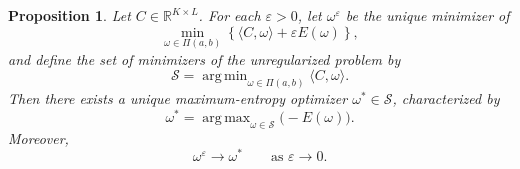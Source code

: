 \documentclass[a4paper,11pt]{article}
\numberwithin{equation}{section}
\newtheorem{prop}[thm]{Proposition}
\DeclareMathOperator*{\argmin}{arg\,min}
\DeclareMathOperator*{\argmax}{arg\,max}
\newcommand{\eps}{\varepsilon}
\newcommand{\RR}{\mathbb{R}}
\begin{document}
\begin{prop}\label{prop:entropy-selection}
Let $C\in\RR^{K\times L}$. For each $\eps>0$, let $\omega^\eps$ be the unique minimizer of
\begin{equation}\label{eq:entropy-regularized-linear-problem}
  \min_{\omega\in\Pi(a,b)}
  \left\{
  \langle C,\omega\rangle+\eps E(\omega)
  \right\},
\end{equation}
and define the set of minimizers of the unregularized problem by
\begin{equation}\label{eq:unregularized-optimal-set}
  \mathcal S=\argmin_{\omega\in\Pi(a,b)}\langle C,\omega\rangle.
\end{equation}
Then there exists a unique maximum-entropy optimizer $\omega^*\in\mathcal S$, characterized by
\begin{equation*}
  \omega^*=\argmax_{\omega\in\mathcal S}\bigl(-E(\omega)\bigr).
\end{equation*}
Moreover,
\begin{equation}\label{eq:entropy-selection-limit}
  \omega^\eps\to\omega^*
  \qquad\text{as }\eps\to0.
\end{equation}
\end{prop}
\end{document}
